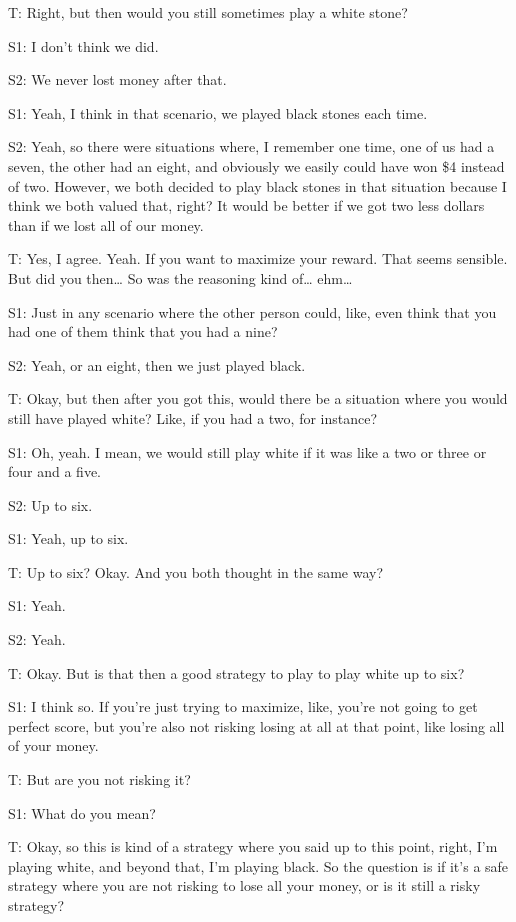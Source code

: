 T: Right, but then would you still sometimes play a white stone? 

S1: I don't think we did.

S2: We never lost money after that. 

S1: Yeah, I think in that scenario, we played black stones each time.

S2: Yeah, so there were situations where, I remember one time, one of us had a seven, the other had an eight, and obviously we easily could have won \$4 instead of two. However, we both decided to play black stones in that situation because I think we both valued that, right? It would be better if we got two less dollars than if we lost all of our money. 

T: Yes, I agree. Yeah. If you want to maximize your reward. That seems sensible. But did you then… So was the reasoning kind of… ehm… 

S1: Just in any scenario where the other person could, like, even think that you had one of them think that you had a nine? 

S2: Yeah, or an eight, then we just played black. 

T: Okay, but then after you got this, would there be a situation where you would still have played white? Like, if you had a two, for instance? 

S1: Oh, yeah. I mean, we would still play white if it was like a two or three or four and a five.

S2: Up to six. 

S1: Yeah, up to six. 

T: Up to six? Okay. And you both thought in the same way?

S1: Yeah. 

S2: Yeah.

T: Okay. But is that then a good strategy to play to play white up to six? 

S1: I think so. If you're just trying to maximize, like, you're not going to get perfect score, but you're also not risking losing at all at that point, like losing all of your money.

T: But are you not risking it? 

S1: What do you mean? 

T: Okay, so this is kind of a strategy where you said up to this point, right, I'm playing white, and beyond that, I'm playing black. So the question is if it’s a safe strategy where you are not risking to lose all your money, or is it still a risky strategy? 

